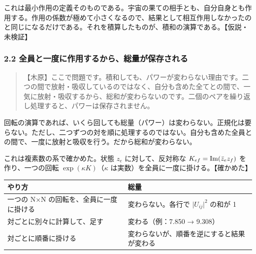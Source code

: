 \documentclass[
  a4paper,
]{ltjsarticle}
\newcounter{none} %
\begin{document}
これは最小作用の定義そのものである。宇宙の果ての相手とも、自分自身とも作用する。作用の係数が極めて小さくなるので、結果として相互作用しなかったのと同じになるだけである。それを積算したものが、積和の演算である。【仮説・未検証】

\subsubsection{2.2
全員と一度に作用するから、総量が保存される}\label{ux5168ux54e1ux3068ux4e00ux5ea6ux306bux4f5cux7528ux3059ux308bux304bux3089ux7dcfux91cfux304cux4fddux5b58ux3055ux308cux308b}

\begin{quote}
【木原】ここで問題です。積和しても、パワーが変わらない理由です。二つの間で放射・吸収しているのではなく、自分も含めた全てとの間で、一気に放射・吸収するから、総和が変わらないのです。二個のペアを繰り返し処理すると、パワーは保存されません。
\end{quote}

回転の演算であれば、いくら回しても総量（パワー）は変わらない。正規化は要らない。ただし、二つずつの対を順に処理するのではない。自分も含めた全員との間で、一度に放射と吸収を行う。だから総和が変わらない。

これは複素数の系で確かめた。状態 \(z_e\) に対して、反対称な
\(K_{ef} = {\rm Im}(\bar z_e z_f)\) を作り、一つの回転
\(\exp(\kappa K)\)（\(\kappa\)
は実数）を全員に一度に掛ける。【確かめた】

{\def\LTcaptype{none} %
\begin{longtable}[]{@{}
  >{\raggedright\arraybackslash}p{}
  >{\raggedright\arraybackslash}p{}@{}}
\toprule\noalign{}
\begin{minipage}[b]{\linewidth}\raggedright
やり方
\end{minipage} & \begin{minipage}[b]{\linewidth}\raggedright
総量
\end{minipage} \\
\midrule\noalign{}
\endhead
\bottomrule\noalign{}
\endlastfoot
一つの N×N の回転を、全員に一度に掛ける & 変わらない。各行で
\(\lvert U_{ij}\rvert^2\) の和が 1 \\
対ごとに別々に計算して、足す & 変わる（例：7.850 → 9.308） \\
対ごとに順番に掛ける & 変わらないが、順番を逆にすると結果が変わる \\
\end{longtable}
}
\end{document}
